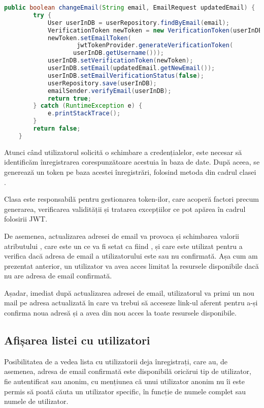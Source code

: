 \begin{lstlisting}[language=Java]
	public boolean changeEmail(String email, EmailRequest updatedEmail) {
		try {
			User userInDB = userRepository.findByEmail(email);
			VerificationToken newToken = new VerificationToken(userInDB);
			newToken.setEmailToken(
					jwtTokenProvider.generateVerificationToken(
				   userInDB.getUsername()));
			userInDB.setVerificationToken(newToken);
			userInDB.setEmail(updatedEmail.getNewEmail());
			userInDB.setEmailVerificationStatus(false);
			userRepository.save(userInDB);
			emailSender.verifyEmail(userInDB);
			return true;
		} catch (RuntimeException e) {
			e.printStackTrace();
		}
		return false;
	}
\end{lstlisting}
\bigskip

Atunci când utilizatorul solicită o schimbare a credențialelor, este necesar să identificăm înregistrarea corespunzătoare acestuia în baza de date. După aceea, se generează un token pe baza acestei înregistrări, folosind metoda  din cadrul clasei .\newline

Clasa  este responsabilă pentru gestionarea token-ilor, care acoperă factori precum generarea, verificarea validității și tratarea excepțiilor ce pot apărea în cadrul folosirii JWT.\newline

De asemenea, actualizarea adresei de email va provoca și schimbarea valorii atributului , care este un  ce va fi setat ca fiind , și care este utilizat pentru a verifica dacă adresa de email a utilizatorului este sau nu confirmată. Așa cum am prezentat anterior, un utilizator va avea acces limitat la resursele disponibile dacă nu are adresa de email confirmată.\newline

Așadar, imediat după actualizarea adresei de email, utilizatorul va primi un nou mail pe adresa actualizată în care va trebui să acceseze link-ul aferent pentru a-și confirma noua adresă și a avea din nou acces la toate resursele disponibile.\newline


\subsection{Afișarea listei cu utilizatori}

Posibilitatea de a vedea lista cu utilizatorii deja înregistrați, care au, de asemenea, adresa de email confirmată este disponibilă oricărui tip de utilizator, fie autentificat sau anonim, cu mențiunea că unui utilizator anonim nu îi este permis să poată căuta un utilizator specific, în funcție de numele complet sau numele de utilizator.\newline

